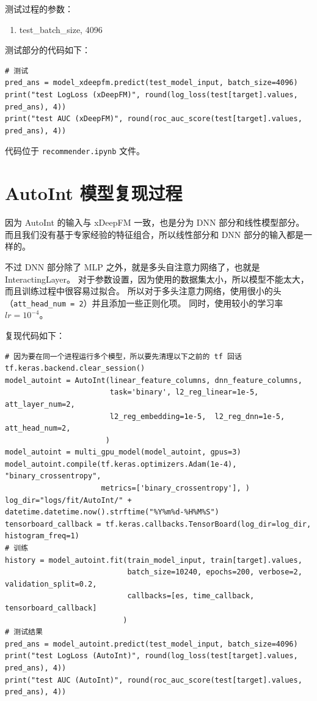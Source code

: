 \documentclass[degree=project,degree-type=project,cjk-font=noto]{thuthesis}
\begin{document}
测试过程的参数：

\begin{enumerate}
  \item test\_batch\_size, 4096
\end{enumerate}

测试部分的代码如下：

  \begin{verbatim}
# 测试
pred_ans = model_xdeepfm.predict(test_model_input, batch_size=4096)
print("test LogLoss (xDeepFM)", round(log_loss(test[target].values, pred_ans), 4))
print("test AUC (xDeepFM)", round(roc_auc_score(test[target].values, pred_ans), 4))
  \end{verbatim}


代码位于 \texttt{recommender.ipynb} 文件。

\section{AutoInt 模型复现过程}
\label{sec:autoint_reproduce}

因为 AutoInt 的输入与 xDeepFM 一致，也是分为 DNN 部分和线性模型部分。
而且我们没有基于专家经验的特征组合，所以线性部分和 DNN 部分的输入都是一样的。

不过 DNN 部分除了 MLP 之外，就是多头自注意力网络了，也就是 InteractingLayer。
对于参数设置，因为使用的数据集太小，所以模型不能太大，而且训练过程中很容易过拟合。
所以对于多头注意力网络，使用很小的头（\texttt{att\_head\_num = 2}）并且添加一些正则化项。
同时，使用较小的学习率 $lr = 10^{-4}$。

复现代码如下：


  \begin{verbatim}
# 因为要在同一个进程运行多个模型，所以要先清理以下之前的 tf 回话
tf.keras.backend.clear_session()
model_autoint = AutoInt(linear_feature_columns, dnn_feature_columns,
                        task='binary', l2_reg_linear=1e-5, att_layer_num=2,
                        l2_reg_embedding=1e-5,  l2_reg_dnn=1e-5, att_head_num=2,
                       )
model_autoint = multi_gpu_model(model_autoint, gpus=3)
model_autoint.compile(tf.keras.optimizers.Adam(1e-4), "binary_crossentropy",
                      metrics=['binary_crossentropy'], )
log_dir="logs/fit/AutoInt/" + datetime.datetime.now().strftime("%Y%m%d-%H%M%S")
tensorboard_callback = tf.keras.callbacks.TensorBoard(log_dir=log_dir, histogram_freq=1)
# 训练
history = model_autoint.fit(train_model_input, train[target].values,
                            batch_size=10240, epochs=200, verbose=2, validation_split=0.2,
                            callbacks=[es, time_callback, tensorboard_callback]
                           )
# 测试结果
pred_ans = model_autoint.predict(test_model_input, batch_size=4096)
print("test LogLoss (AutoInt)", round(log_loss(test[target].values, pred_ans), 4))
print("test AUC (AutoInt)", round(roc_auc_score(test[target].values, pred_ans), 4))
  \end{verbatim}
\end{document}
